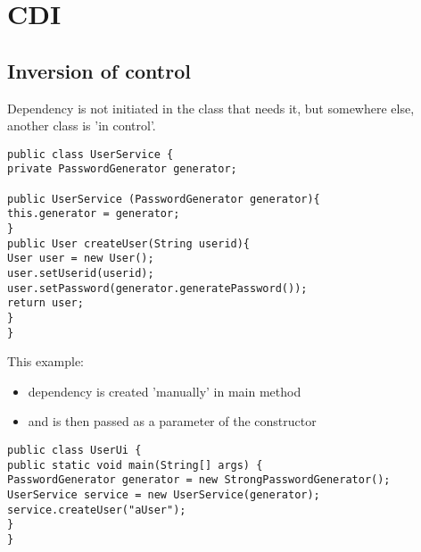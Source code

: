 \chapter{CDI}
\label{CDI}
\thispagestyle{chapternohead}

	
\pagestyle{ruledfilip}

\section{Inversion of control}

Dependency is not initiated in the class that needs it, but somewhere else, another class is 'in control’.

\begin{verbatim}
public class UserService {
private PasswordGenerator generator;

public UserService (PasswordGenerator generator){
this.generator = generator;
}
public User createUser(String userid){
User user = new User();
user.setUserid(userid);
user.setPassword(generator.generatePassword());
return user;
}
}
\end{verbatim}

This example:
\begin{itemize}
	
	\item dependency is created 'manually’ in main method
	\item and is then passed as a parameter of the constructor
\end{itemize}

\begin{verbatim}
public class UserUi {
public static void main(String[] args) {
PasswordGenerator generator = new StrongPasswordGenerator();
UserService service = new UserService(generator);
service.createUser("aUser");
}
}
\end{verbatim}


\section{}


